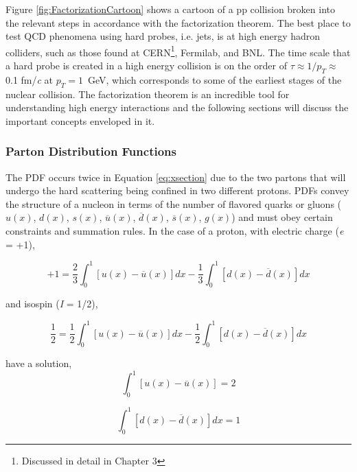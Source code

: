 \noindent
Figure \ref{fig:FactorizationCartoon} shows a cartoon of a pp collision broken into the relevant steps in accordance with the factorization theorem.  The best place to test QCD phenomena using hard probes, i.e. jets, is at high energy hadron colliders, such as those found at CERN\footnote{Discussed in detail in Chapter 3}, Fermilab, and BNL. The time scale that a hard probe is created in a high energy collision is on the order of $\tau \approx 1/p_{T} \approx$ \, 0.1 fm/\textit{c} at $p_{T} = 1 \,$ GeV, which corresponds to some of the earliest stages of the nuclear collision.  The factorization theorem is an incredible tool for understanding high energy interactions and the following sections will discuss the important concepts enveloped in it.

\subsubsection{Parton Distribution Functions}
The PDF occurs twice in Equation \ref{eq:xsection} due to the two partons that will undergo the hard scattering being confined in two different protons.  PDFs convey the structure of a nucleon in terms of the number of flavored quarks or gluons ($u(x)$, $d(x)$, $s(x)$, $\overline{u}(x)$, $\overline{d}(x)$, $\overline{s}(x)$, $g(x)$) and must obey certain constraints and summation rules.  In the case of a proton, with electric charge (\textit{e} = +1),

\begin{equation}
+1 = \frac{2}{3} \int_{0}^{1} [u(x) - \overline{u}(x)] dx - \frac{1}{3} \int^{1}_{0} [d(x) - \overline{d}(x)] dx
\label{eq:PDFcharge}
\end{equation}

\noindent
and isospin (\textit{I} = 1/2),

\begin{equation}
\frac{1}{2} = \frac{1}{2} \int_{0}^{1} [u(x) - \overline{u}(x)] dx - \frac{1}{2} \int^{1}_{0} [d(x) - \overline{d}(x)] dx
\label{eq:PDFIso}
\end{equation}

\noindent
have a solution,
\begin{equation}
 \int_{0}^{1} [u(x) - \overline{u}(x)] = 2
\label{eq:PDFSouU}
\end{equation}

\begin{equation}
\int^{1}_{0} [d(x) - \overline{d}(x)] dx = 1
\label{eq:PDFSouD}
\end{equation}

